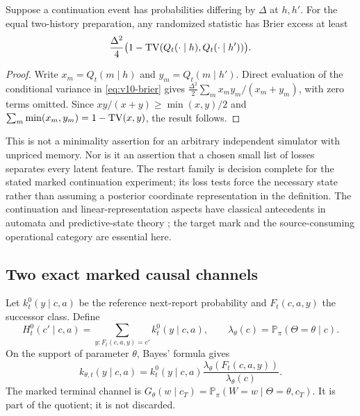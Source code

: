 \begin{proposition}\label{prop:v10-overlap}
Suppose a continuation event has probabilities differing by $\Delta$
at $h,h'$. For the equal two-history preparation, any randomized
statistic has Brier excess at least
\[
 \frac{\Delta^2}{4}
 \bigl(1-\mathrm{TV}(Q_t(\cdot\mid h),Q_t(\cdot\mid h'))\bigr).
\]
\end{proposition}
\begin{proof}
Write $x_m=Q_t(m\mid h)$ and $y_m=Q_t(m\mid h')$. Direct evaluation
of the conditional variance in \eqref{eq:v10-brier} gives
$\frac{\Delta^2}{2}\sum_m x_my_m/(x_m+y_m)$, with zero terms omitted.
Since $xy/(x+y)\ge\min(x,y)/2$ and
$\sum_m\min(x_m,y_m)=1-\mathrm{TV}(x,y)$, the result follows.
\end{proof}

This is not a minimality assertion for an arbitrary independent
simulator with unpriced memory. Nor is it an assertion that a chosen
small list of losses separates every latent feature. The restart
family is decision complete for the stated marked continuation
experiment; its loss tests force the necessary state rather than
assuming a posterior coordinate representation in the definition.
The continuation and linear-representation aspects have classical
antecedents in automata and predictive-state theory
\cite{Nerode1958,ShaliziCrutchfield2001,Kiefer2020}; the target mark and
the source-consuming operational category are essential here.

\subsection{Two exact marked causal channels}
Let $k^0_t(y\mid c,a)$ be the reference next-report probability and
$F_t(c,a,y)$ the successor class. Define
\[
 H^0_t(c'\mid c,a)=
 \sum_{y:F_t(c,a,y)=c'}k^0_t(y\mid c,a),\qquad
 \lambda_\theta(c)=\mathbb P_\pi(\Theta=\theta\mid c).
\]
On the support of parameter $\theta$, Bayes' formula gives
\begin{equation}\label{eq:v10-ratio}
 k_{\theta,t}(y\mid c,a)
 =k^0_t(y\mid c,a)
   \frac{\lambda_\theta(F_t(c,a,y))}{\lambda_\theta(c)}.
\end{equation}
The marked terminal channel is
$G_\theta(w\mid c_T)=\mathbb P_\pi(W=w\mid\Theta=\theta,c_T)$.
It is part of the quotient; it is not discarded.


